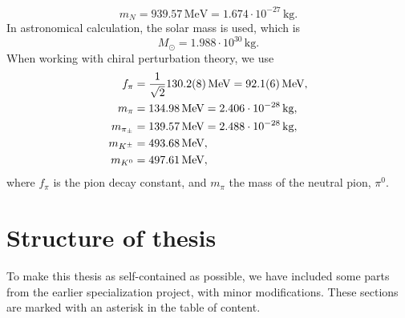 %
\begin{equation}
    \label{mass of neutron}
    m_N = 939.57 \, \text{MeV} = 1.674\cdot 10^{-27} \, \text{kg}.
\end{equation}
%
In astronomical calculation, the solar mass is used, which is
%
\begin{equation}
    \label{solar mass}
    M_\odot = 1.988 \cdot 10^{30} \, \text{kg}.
\end{equation}
%
When working with chiral perturbation theory, we use
%
\begin{align}
    \label{pion decay constant}
    f_\pi & = \frac{1}{\sqrt{2}}130.2 (8) \, \text{MeV} = 92.1(6) \, \text{MeV}, \\
    \label{pion mass}
    m_\pi & = 134.98 \, \text{MeV} = 2.406 \cdot 10^{-28} \, \text{kg}, \\
    \label{charged pion mass}
    m_{\pi_\pm} &= 139.57 \, \text{MeV} = 2.488 \cdot 10^{-28}\, \text{kg}, \\
    m_{{K^\pm}} & = 493.68\,\text{MeV}, \\
    m_{{K^0}} & = 497.61\,\text{MeV},
\end{align}
%
where $f_\pi$ is the pion decay constant, and $m_\pi$ the mass of the neutral pion, $\pi^0$.

\section{Structure of thesis}

To make this thesis as self-contained as possible, we have included some parts from the earlier specialization project, with minor modifications.
These sections are marked with an asterisk in the table of content.
